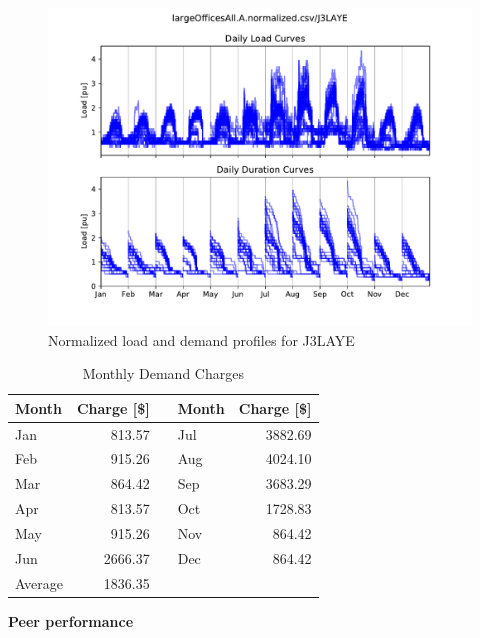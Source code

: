 \documentclass[11pt]{article}
\begin{document}
\pagestyle{demand}
\lipsum[1][1-7]

\begin{figure}[!h]
\centering
\includegraphics[width=\columnwidth, page=1, trim=0in 0.45in 0in 0.45in, clip]{visuals/J3LAYE.duration.monthly.test.pdf}
\caption{Normalized load and demand profiles for J3LAYE}
\label{fig:duration}
\end{figure}

\lipsum[1][1-7]

\begin{table}[th!]
  \centering
  \caption{Monthly Demand Charges}
  \vspace{1.5ex}
  \label{tab:demand}
  \begin{tabular}{p{0.75in}rp{0.2in}p{0.75in}r}
    Month & Charge [\$] & & Month & Charge [\$] \\
    \midrule
    Jan & 813.57 & & Jul & 3882.69 \\
    Feb & 915.26 & & Aug & 4024.10 \\
    Mar & 864.42 & & Sep & 3683.29 \\
    Apr & 813.57 & & Oct & 1728.83 \\
    May & 915.26 & & Nov & 864.42 \\
    Jun & 2666.37 & & Dec & 864.42 \\
    \midrule
    Average & 1836.35
  \end{tabular}
\end{table}

\vspace{3ex}
\textbf{\Large Peer performance}
\vspace{1ex}
\end{document}
